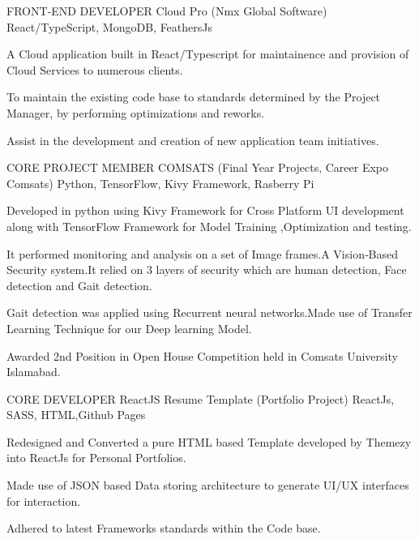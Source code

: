 \begin{cventries}
  \cventry
    {FRONT‑END DEVELOPER} %
    {Cloud Pro (Nmx Global Software)} %
    {React/TypeScript, MongoDB, FeathersJs} %
    {} %
    {
      \begin{cvitems} %
        \item {A Cloud application built in React/Typescript for maintainence and provision of Cloud Services to numerous clients.}
        \item {To maintain the existing code base to standards determined by the Project Manager, by performing optimizations and reworks.}
        \item {Assist in the development and creation of new application team initiatives.}
      \end{cvitems}
    }

  \cventry
    {CORE PROJECT MEMBER} %
    {COMSATS (Final Year Projects, Career Expo Comsats)} %
    {Python, TensorFlow, Kivy Framework, Rasberry Pi} %
    {} %
    {
      \begin{cvitems} %
        \item {Developed in python using Kivy Framework for Cross Platform UI development along with TensorFlow Framework for Model Training ,Optimization and testing.}
        \item {It performed monitoring and analysis on a set of Image frames.A Vision‑Based Security system.It relied on 3 layers of security which are human detection, Face detection and Gait detection.}
        \item {Gait detection was applied using Recurrent neural networks.Made use of Transfer Learning Technique for our Deep learning Model.}
        \item {Awarded 2nd Position in Open House Competition held in Comsats University Islamabad.}
      \end{cvitems}
    }

  \cventry
    {CORE DEVELOPER} %
    {ReactJS Resume Template (Portfolio Project)} %
    {ReactJs, SASS, HTML,Github Pages} %
    {} %
    {
      \begin{cvitems} %
        \item {Redesigned and Converted a pure HTML based Template developed by Themezy into ReactJs for Personal Portfolios.}
        \item {Made use of JSON based Data storing architecture to generate UI/UX interfaces for interaction.}
        \item {Adhered to latest Frameworks standards within the Code base.}
      \end{cvitems}
    }

\end{cventries}
